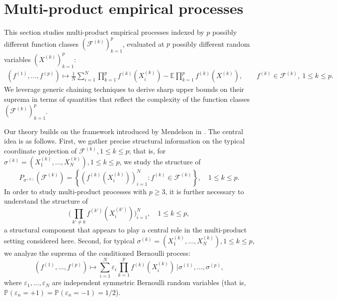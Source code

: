 \documentclass[numbers,webpdf,imaiai]{ima-authoring-template}
\theoremstyle{thmstyletwo}%
\numberwithin{equation}{section}
\numberwithin{equation}{section}
\newcommand{\F}{\mathcal{F}}
\newcommand{\E}{\mathbb{E}}
\renewcommand{\P}{\mathbb{P}}
\begin{document}
\section{Multi-product empirical processes}\label{sec:multi}

This section studies multi-product empirical processes indexed by $p$ possibly different function classes $(\F^{(k)})_{k=1}^{p}$, evaluated at $p$ possibly different random variables $(X^{(k)})_{k=1}^{p}$:
\begin{align}\label{eq:multi-product-processes}
(f^{(1)},\ldots,f^{(p)})\mapsto \frac{1}{N}\sum_{i=1}^N \prod_{k=1}^p f^{(k)}(X^{(k)}_i)-\E \prod_{k=1}^p f^{(k)}(X^{(k)}),\qquad f^{(k)}\in \F^{(k)}, \ 1\le k\le p.
\end{align}
We leverage generic chaining techniques to derive sharp upper bounds on their suprema in terms of quantities that reflect the complexity of the function classes $(\F^{(k)})_{k=1}^{p}$.

Our theory builds on the framework introduced by Mendelson in \cite{mendelson2016upper}. The central idea is as follows. First, we gather precise structural information on the typical coordinate projection of $\F^{(k)}, 1\le k\le p$; that is, for $\sigma^{(k)}=(X^{(k)}_1,\ldots,X^{(k)}_N), 1\le k\le p$, we study the structure of
\[
P_{\sigma^{(k)}}(\F^{(k)})=\left\{(f^{(k)}(X^{(k)}_i))_{i=1}^{N}: f^{(k)}\in \F^{(k)}\right\},\quad 1 \le k\le p.
\]
In order to study multi-product processes with $p\ge 3$, it is further necessary to understand the structure of
\[
\bigg(\prod_{k'\ne k} f^{(k')}(X_i^{(k')})\bigg)_{i=1}^{N},\quad 1\le k\le p,
\]
a structural component that appears to play a central role in the multi-product setting considered here. Second, for typical $\sigma^{(k)}=(X^{(k)}_1,\ldots,X^{(k)}_N), 1\le k\le p$, we analyze the suprema of the conditioned Bernoulli process:
\[
(f^{(1)},\ldots,f^{(p)}) \mapsto \sum_{i=1}^N \varepsilon_i \prod_{k=1}^{p}f^{(k)}(X^{(k)}_i)  \  \Big | \sigma^{(1)},\ldots ,\sigma^{(p)},
\]
where $\varepsilon_1,\ldots,\varepsilon_N$ are independent symmetric Bernoulli random variables (that is, $\P(\varepsilon_n=+1)=\P(\varepsilon_n=-1)=1/2$). 
\end{document}
